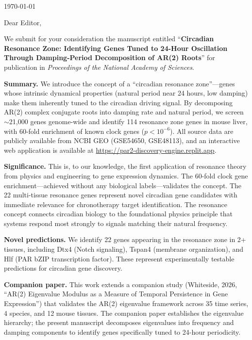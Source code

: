 \documentclass[11pt,letterpaper]{article}
\begin{document}
\today

\vspace{1cm}

Dear Editor,

\vspace{0.5cm}

We submit for your consideration the manuscript entitled ``\textbf{Circadian Resonance Zone: Identifying Genes Tuned to 24-Hour Oscillation Through Damping-Period Decomposition of AR(2) Roots}'' for publication in \textit{Proceedings of the National Academy of Sciences}.

\vspace{0.3cm}

\textbf{Summary.} We introduce the concept of a ``circadian resonance zone''---genes whose intrinsic dynamical properties (natural period near 24 hours, low damping) make them inherently tuned to the circadian driving signal. By decomposing AR(2) complex conjugate roots into damping rate and natural period, we screen $\sim$21,000 genes genome-wide and identify 114 resonance zone genes in mouse liver, with 60-fold enrichment of known clock genes ($p < 10^{-6}$). All source data are publicly available from NCBI GEO (GSE54650, GSE48113), and an interactive web application is available at \url{https://par2-discovery-engine.replit.app}.

\vspace{0.3cm}

\textbf{Significance.} This is, to our knowledge, the first application of resonance theory from physics and engineering to gene expression dynamics. The 60-fold clock gene enrichment---achieved without any biological labels---validates the concept. The 22 multi-tissue resonance genes represent novel circadian gene candidates with immediate relevance for chronotherapy target identification. The resonance concept connects circadian biology to the foundational physics principle that systems respond most strongly to signals matching their natural frequency.

\vspace{0.3cm}

\textbf{Novel predictions.} We identify 22 genes appearing in the resonance zone in 2+ tissues, including Dtx4 (Notch signaling), Tspan4 (membrane organization), and Hlf (PAR bZIP transcription factor). These represent experimentally testable predictions for circadian gene discovery.

\vspace{0.3cm}

\textbf{Companion paper.} This work extends a companion study (Whiteside, 2026, ``AR(2) Eigenvalue Modulus as a Measure of Temporal Persistence in Gene Expression'') that validates the AR(2) eigenvalue framework across 35 time series, 4 species, and 12 mouse tissues. The companion paper establishes the eigenvalue hierarchy; the present manuscript decomposes eigenvalues into frequency and damping components to identify genes specifically tuned to 24-hour periodicity.
\end{document}
